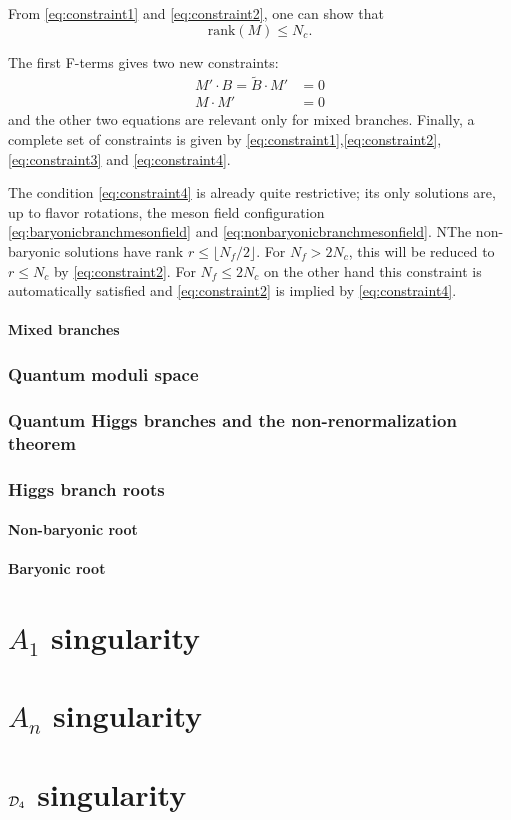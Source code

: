             From \eqref{eq:constraint1} and \eqref{eq:constraint2}, one can show that
            \begin{equation}
                \text{rank}(M)\leq N_c.
            \end{equation}

            The first F-terms gives two new constraints:
            \begin{align}
                M'\cdot B = \tilde{B}\cdot M' &= 0\label{eq:constraint3}\\
                M\cdot M' &= 0\label{eq:constraint4}
            \end{align} 
            and the other two equations are relevant only for mixed branches. Finally, a complete set of constraints is given by \eqref{eq:constraint1},\eqref{eq:constraint2},\eqref{eq:constraint3} and \eqref{eq:constraint4}.

            The condition \eqref{eq:constraint4} is already quite restrictive; its only solutions are, up to flavor rotations, the meson field configuration \eqref{eq:baryonicbranchmesonfield} and \eqref{eq:nonbaryonicbranchmesonfield}. NThe non-baryonic solutions have rank $r\leq\lfloor N_f/2\rfloor$. For $N_f> 2N_c$, this will be reduced to $r\leq N_c$ by \eqref{eq:constraint2}. For $N_f\leq 2N_c$ on the other hand this constraint is automatically satisfied and \eqref{eq:constraint2} is implied by \eqref{eq:constraint4}.

    \subsection{Mixed branches}

        

\section{Quantum moduli space}

\section{Quantum Higgs branches and the non-renormalization theorem}

\section{Higgs branch roots}

    \subsection{Non-baryonic root}

    \subsection{Baryonic root}

\part{$A_1$ singularity}

\part{$A_n$ singularity}

\part{$\mathcal{D}_4$ singularity}